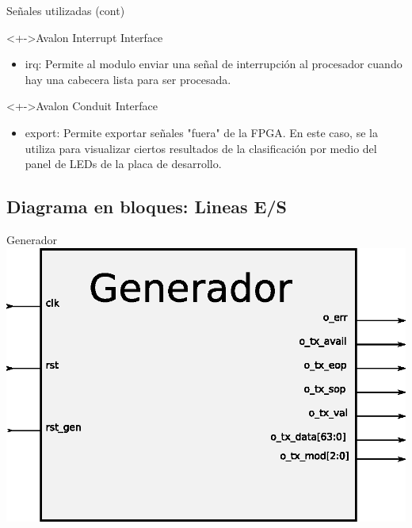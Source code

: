 \documentclass[xcolor=dvipsnames]{beamer}
\begin{document}
\begin{frame}{Señales utilizadas (cont)}
  \begin{block}<+->{Avalon Interrupt Interface}
  \begin{itemize}
      \scriptsize
	\item irq: Permite al modulo enviar una señal de interrupción al procesador cuando hay una cabecera lista para ser procesada.
   \end{itemize}
\end{block}	

\begin{block}<+->{Avalon Conduit Interface}
  \begin{itemize}
      \scriptsize
	\item export: Permite exportar señales "fuera" de la FPGA. En este caso, se la utiliza para visualizar ciertos resultados de la clasificación por medio del panel de LEDs de la placa de desarrollo.	
   \end{itemize}
  \end{block}


\end{frame}

\subsection{Diagrama en bloques: Lineas E/S}
\begin{frame}{Generador}
\center 
\includegraphics[scale=0.60]{figures/bloqgenerador.eps}
\end{frame}
\end{document}
